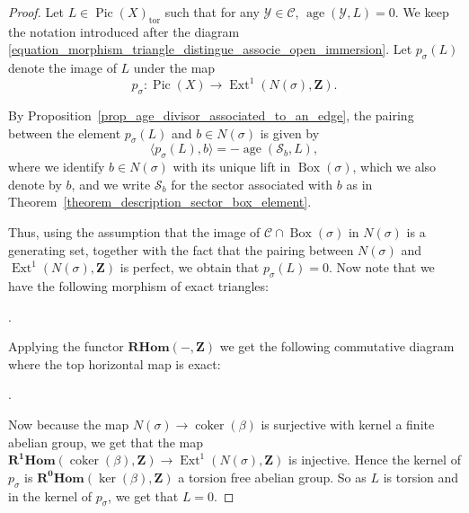 \documentclass{proc-l}
\newcommand{\Z}{\mathbf{Z}}
\DeclareMathOperator{\Pic}{Pic}
\DeclareMathOperator{\Ext}{Ext}
\DeclareMathOperator{\coneform}{cone}
\DeclareMathOperator{\age}{age}
\DeclareMathOperator{\coker}{coker}
\DeclareMathOperator{\tor}{tor}
\DeclareMathOperator{\Boxe}{Box}
\newcommand{\stackY}{\mathcal{Y}}
\newcommand{\stackS}{\mathcal{S}}
\newcommand{\RHom}{\mathbf{R Hom}}
\theoremstyle{definition}
\theoremstyle{remark}
\numberwithin{equation}{section}
\begin{document}
\begin{proof}
Let $L \in \Pic(X)_{\tor}$ such that for any $\stackY \in \mathcal{C}$, $\age(\stackY,L) = 0$. We keep the notation introduced after the diagram
\eqref{equation_morphism_triangle_distingue_associe_open_immersion}. Let
$p_{\sigma}(L)$ denote the image of $L$ under the map
\[
p_{\sigma} : \Pic(X) \longrightarrow \Ext^1(N(\sigma),\Z).
\]

By Proposition~\ref{prop_age_divisor_associated_to_an_edge}, the pairing
between the element $p_{\sigma}(L)$ and $b \in N(\sigma)$ is given by
\[
\langle p_{\sigma}(L), b \rangle = -\age(\stackS_b,L),
\]
where we identify $b \in N(\sigma)$ with its unique lift in $\Boxe(\sigma)$,
which we also denote by $b$, and we write $\stackS_b$ for the sector
associated with $b$ as in Theorem~\ref{theorem_description_sector_box_element}.

Thus, using the assumption that the image of
$\mathcal{C} \cap \Boxe(\sigma)$ in $N(\sigma)$ is a generating set,
together with the fact that the pairing between $N(\sigma)$ and
$\Ext^1(N(\sigma),\Z)$ is perfect, we obtain that $p_{\sigma}(L)=0$. Now note that we have the following morphism of exact triangles:
\begin{center}
.
\end{center}

Applying the functor $\RHom(-,\Z)$ we get the following commutative diagram where the top horizontal map is exact:
\begin{center}
.
\end{center}Now because the map $N(\sigma) \rightarrow \coker(\beta)$ is surjective with kernel a finite abelian group, we get that the map $\mathbf{R^1Hom}(\coker(\beta),\Z) \rightarrow \Ext^1(N(\sigma),\Z)$ is injective. Hence the kernel of $p_{\sigma}$ is $\mathbf{R^0Hom}(\ker(\beta),\Z)$ a torsion free abelian group. So as $L$ is torsion and in the kernel of $p_{\sigma}$, we get that $L = 0$.
\end{proof}
\end{document}
